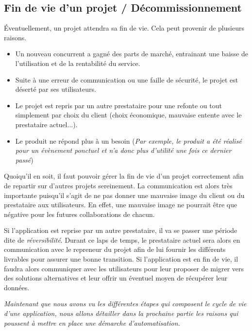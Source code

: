 \subsection{Fin de vie d'un projet / Décommissionnement}

Éventuellement, un projet attendra sa fin de vie. Cela peut provenir de plusieurs raisons.

\begin{itemize}
	\setlength\itemsep{0em}
	\item Un nouveau concurrent a gagné des parts de marché, entrainant une baisse de l'utilisation et de la rentabilité du service.
	\item Suite à une erreur de communication ou une faille de sécurité, le projet est déserté par ses utilisateurs.
	\item Le projet est repris par un autre prestataire pour une refonte ou tout simplement par choix du client (choix économique, mauvaise entente avec le prestataire actuel...).
	\item Le produit ne répond plus à un besoin (\emph{Par exemple, le produit a été réalisé pour un évènement ponctuel et n'a donc plus d'utilité une fois ce dernier passé})
\end{itemize}

Quoiqu'il en soit, il faut pouvoir gérer la fin de vie d'un projet correctement afin de repartir sur d'autres projets sereinement. La communication est alors très importante puisqu'il s'agit de ne pas donner une mauvaise image du client ou du prestataire aux utilisateurs. En effet, une mauvaise image ne pourrait être que négative pour les futures collaborations de chacun.

Si l'application est reprise par un autre prestataire, il va se passer une période dite de \emph{réversibilité}. Durant ce laps de temps, le prestataire actuel sera alors en communication avec le repreneur du projet afin de lui fournir les différents livrables pour assurer une bonne transition. Si l'application est en fin de vie, il faudra alors communiquer avec les utilisateurs pour leur proposer de migrer vers des solutions alternatives et leur offrir un éventuel moyen de récupérer leur données.

\hrulefill

\emph{Maintenant que nous avons vu les différentes étapes qui composent le cycle de vie d'une application, nous allons détailler dans la prochaine partie les raisons qui poussent à mettre en place une démarche d'automatisation.}